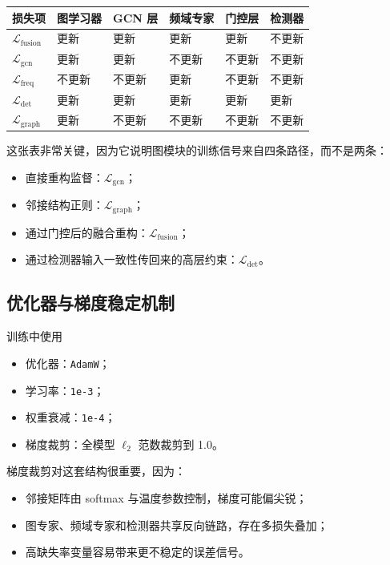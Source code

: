 \documentclass[UTF8]{ctexart}
\begin{document}
\begin{center}
\begin{tabular}{llllll}
\toprule
损失项 & 图学习器 & GCN 层 & 频域专家 & 门控层 & 检测器 \\
\midrule
\(\mathcal{L}_{\text{fusion}}\) & 更新 & 更新 & 更新 & 更新 & 不更新 \\
\(\mathcal{L}_{\text{gcn}}\) & 更新 & 更新 & 不更新 & 不更新 & 不更新 \\
\(\mathcal{L}_{\text{freq}}\) & 不更新 & 不更新 & 更新 & 不更新 & 不更新 \\
\(\mathcal{L}_{\text{det}}\) & 更新 & 更新 & 更新 & 更新 & 更新 \\
\(\mathcal{L}_{\text{graph}}\) & 更新 & 不更新 & 不更新 & 不更新 & 不更新 \\
\bottomrule
\end{tabular}
\end{center}

这张表非常关键，因为它说明图模块的训练信号来自四条路径，而不是两条：
\begin{itemize}
    \item 直接重构监督：\(\mathcal{L}_{\text{gcn}}\)；
    \item 邻接结构正则：\(\mathcal{L}_{\text{graph}}\)；
    \item 通过门控后的融合重构：\(\mathcal{L}_{\text{fusion}}\)；
    \item 通过检测器输入一致性传回来的高层约束：\(\mathcal{L}_{\text{det}}\)。
\end{itemize}

\subsection{优化器与梯度稳定机制}

训练中使用
\begin{itemize}
    \item 优化器：\verb|AdamW|；
    \item 学习率：\verb|1e-3|；
    \item 权重衰减：\verb|1e-4|；
    \item 梯度裁剪：全模型 \(\ell_2\) 范数裁剪到 1.0。
\end{itemize}

梯度裁剪对这套结构很重要，因为：
\begin{itemize}
    \item 邻接矩阵由 softmax 与温度参数控制，梯度可能偏尖锐；
    \item 图专家、频域专家和检测器共享反向链路，存在多损失叠加；
    \item 高缺失率变量容易带来更不稳定的误差信号。
\end{itemize}
\end{document}
